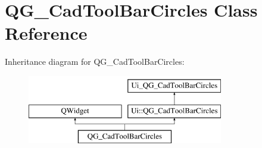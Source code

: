 \hypertarget{classQG__CadToolBarCircles}{\section{Q\-G\-\_\-\-Cad\-Tool\-Bar\-Circles Class Reference}
\label{classQG__CadToolBarCircles}
}
Inheritance diagram for Q\-G\-\_\-\-Cad\-Tool\-Bar\-Circles\-:\begin{figure}[H]
\begin{center}
\leavevmode
\includegraphics[height=3.000000cm]{classQG__CadToolBarCircles}
\end{center}
\end{figure}
